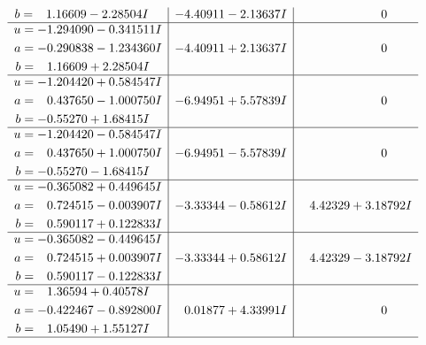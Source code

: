 \documentclass[1p]{elsarticle_modified}
\theoremstyle{definition}
\begin{document}
$$\begin{array}{c|c|c}
\begin{aligned}
b &= \phantom{-}1.16609 - 2.28504 I\end{aligned}
 & -4.40911 - 2.13637 I & \phantom{-0.000000 } 0 \\ \hline\begin{aligned}
u &= -1.294090 - 0.341511 I \\
a &= -0.290838 - 1.234360 I \\
b &= \phantom{-}1.16609 + 2.28504 I\end{aligned}
 & -4.40911 + 2.13637 I & \phantom{-0.000000 } 0 \\ \hline\begin{aligned}
u &= -1.204420 + 0.584547 I \\
a &= \phantom{-}0.437650 - 1.000750 I \\
b &= -0.55270 + 1.68415 I\end{aligned}
 & -6.94951 + 5.57839 I & \phantom{-0.000000 } 0 \\ \hline\begin{aligned}
u &= -1.204420 - 0.584547 I \\
a &= \phantom{-}0.437650 + 1.000750 I \\
b &= -0.55270 - 1.68415 I\end{aligned}
 & -6.94951 - 5.57839 I & \phantom{-0.000000 } 0 \\ \hline\begin{aligned}
u &= -0.365082 + 0.449645 I \\
a &= \phantom{-}0.724515 - 0.003907 I \\
b &= \phantom{-}0.590117 + 0.122833 I\end{aligned}
 & -3.33344 - 0.58612 I & \phantom{-}4.42329 + 3.18792 I \\ \hline\begin{aligned}
u &= -0.365082 - 0.449645 I \\
a &= \phantom{-}0.724515 + 0.003907 I \\
b &= \phantom{-}0.590117 - 0.122833 I\end{aligned}
 & -3.33344 + 0.58612 I & \phantom{-}4.42329 - 3.18792 I \\ \hline\begin{aligned}
u &= \phantom{-}1.36594 + 0.40578 I \\
a &= -0.422467 - 0.892800 I \\
b &= \phantom{-}1.05490 + 1.55127 I\end{aligned}
 & \phantom{-}0.01877 + 4.33991 I & \phantom{-0.000000 } 0\\
 \hline 
 \end{array}$$\newpage$$\begin{array}{c|c|c}  

\end{array}$$
\end{document}
